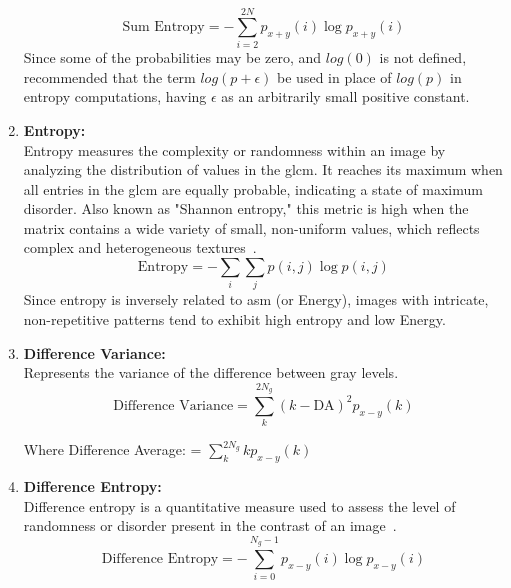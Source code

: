 \begin{enumerate}
        \begin{equation}
            \text{Sum Entropy} = -\sum_{i=2}^{2N} p_{x+y}(i) \log p_{x+y}(i)
        \end{equation}
        Since some of the probabilities may be zero, and $log(0)$ is not defined, \textcite{haralick_textural_1973} recommended that the term $log (p + \epsilon)$ be used in place of $log (p)$ in entropy computations, having $\epsilon$ as an arbitrarily small positive constant.
        
    \item \textbf{Entropy:}\\
    Entropy measures the complexity or randomness within an image by analyzing the distribution of values in the \ac{glcm}. It reaches its maximum when all entries in the \ac{glcm} are equally probable, indicating a state of maximum disorder. Also known as "Shannon entropy," this metric is high when the matrix contains a wide variety of small, non-uniform values, which reflects complex and heterogeneous textures~\cite{oprisan_bounds_2023}.
        \begin{equation}
            \text{Entropy} = -\sum_{i} \sum_{j} p(i,j) \log p(i,j)
        \end{equation}
    Since entropy is inversely related to \ac{asm} (or Energy), images with intricate, non-repetitive patterns tend to exhibit high entropy and low Energy.
        
    \item \textbf{Difference Variance:}\\
    Represents the variance of the difference between gray levels.
        \begin{equation}
            \text{Difference Variance} = \sum_{k}^{2N_g} (k - \text{DA})^{2} p_{x-y}(k)
        \end{equation}

    Where Difference Average:  = $\sum_k^{2N_g} k p_{x-y}(k)$ 
        
    \item \textbf{Difference Entropy:}\\
    Difference entropy is a quantitative measure used to assess the level of randomness or disorder present in the contrast of an image~\cite{oprisan_bounds_2023}.
        \begin{equation}
            \text{Difference Entropy} = -\sum_{i=0}^{N_g-1} p_{x-y}(i) \log p_{x-y}(i)
        \end{equation}
        

\end{enumerate}
